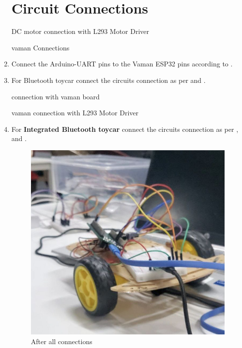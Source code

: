 \begin{enumerate}[label=\thesection.\arabic*.,ref=\thesection.\theenumi]
\section{Circuit Connections}

\begin{table}[!ht]
\centering
	
	\caption{DC motor connection with L293 Motor Driver }
	\label{Tab:dcmotor}
\end{table}

\begin{table}[!ht]
\centering
	
	\caption{ vaman Connections}
	\label{Tab:connections3}
\end{table}
\item Connect the Arduino-UART pins to the Vaman ESP32 pins according to .
\item For Bluetooth toycar connect the circuits connection as per  and  .
\begin{table}[!ht]
\centering
	
	\caption{connection with vaman board }
	\label{Tab:connections}
\end{table}
\begin{table}[!ht]
\centering
	
	\caption{vaman connection with L293 Motor Driver}
	\label{Tab:connections2}
\end{table}
\item For \textbf{Integrated Bluetooth toycar} connect the circuits connection as per  ,  and .

\begin{figure}[!ht]
\centering
\includegraphics[width=0.3\columnwidth]{figs/8.jpg}
\caption{After all connections}
\end{figure}


\end{enumerate}
